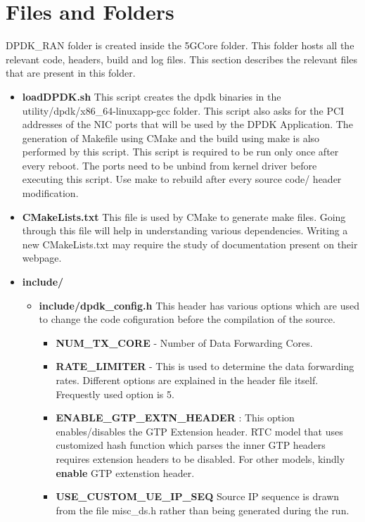 \documentclass{article}
\begin{document}
\section {Files and Folders}
DPDK\_RAN folder is created inside the 5GCore folder. This folder hosts all the relevant code, headers, build and log files.
This section describes the relevant files that are present in this folder.
\begin{itemize}
    \item \textbf{loadDPDK.sh} This script creates the dpdk binaries in the utility/dpdk/x86\_64-linuxapp-gcc folder.
          This script also asks for the PCI addresses of the NIC ports that will be used by the DPDK Application.
          The generation of Makefile using CMake and the build using make is also performed by this script. This script is required to be
          run only once after every reboot. The ports need to be unbind from kernel driver before executing this script. Use make to rebuild after every source code/ header modification.
    \item \textbf{CMakeLists.txt} This file is used by CMake to generate make files. Going through this file will help in understanding various dependencies. Writing a new CMakeLists.txt may require the study of documentation present on their webpage.
    \item \textbf{include/}
          \begin{itemize}
              \item \textbf{include/dpdk\_config.h}
                    This header has various options which are used to change the code cofiguration before the compilation of the source.
                    \begin{itemize}
                        \item \textbf{NUM\_TX\_CORE} - Number of Data Forwarding Cores.
                        \item \textbf{RATE\_LIMITER} - This is used to determine the data forwarding rates. Different options are explained in the header file itself. Frequestly used option is 5.
                        \item \textbf{ENABLE\_GTP\_EXTN\_HEADER} : This option enables/disables the GTP Extension header. RTC model that uses customized hash function which parses the inner GTP headers requires extension headers to be disabled. For other models, kindly \textbf{enable} GTP extenstion header.
                        \item \textbf{USE\_CUSTOM\_UE\_IP\_SEQ} 
                        Source IP sequence is drawn from the file misc\_ds.h rather than being generated during the run.                        
                        

\end{itemize}
\end{itemize}
\end{itemize}
\end{document}
